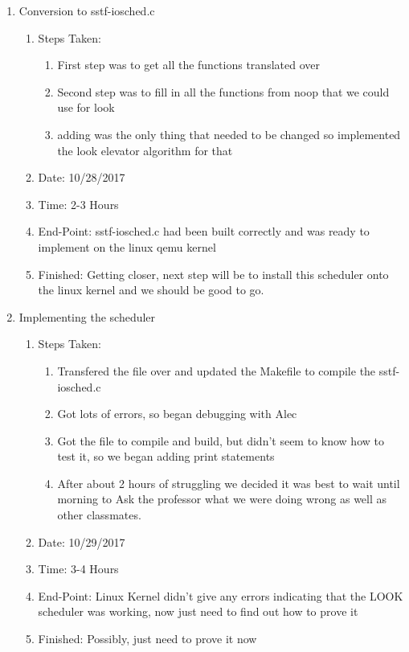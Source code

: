 \documentclass[journal,10pt,onecolumn,compsoc]{IEEEtran} \usepackage[margin=1.0in]{geometry} \usepackage{pdfpages}
\begin{document}
\begin {enumerate}
   
    \item Conversion to sstf-iosched.c
        	\begin {enumerate}
            	\item Steps Taken: 
                	\begin{enumerate}
                    	\item First step was to get all the functions translated over
                        \item Second step was to fill in all the functions from noop that we could use for look
                        \item adding was the only thing that needed to be changed so implemented the look elevator algorithm for that
                    \end{enumerate}
                \item Date: 10/28/2017
                \item Time: 2-3 Hours
                \item End-Point: sstf-iosched.c had been built correctly and was ready to implement on the linux qemu kernel
                \item Finished: Getting closer, next step will be to install this scheduler onto the linux kernel and we should be good to go.
        	\end {enumerate}
    
   
    \item Implementing the scheduler
        	\begin {enumerate}
            	\item Steps Taken: 
                	\begin{enumerate}
                    	\item Transfered the file over and updated the Makefile to compile the sstf-iosched.c
                        \item Got lots of errors, so began debugging with Alec
                        \item Got the file to compile and build, but didn't seem to know how to test it, so we began adding print statements
                        \item After about 2 hours of struggling we decided it was best to wait until morning to Ask the professor what we were doing wrong as well as other classmates.
                    \end{enumerate}
                \item Date: 10/29/2017
                \item Time: 3-4 Hours
                \item End-Point: Linux Kernel didn't give any errors indicating that the LOOK scheduler was working, now just need to find out how to prove it
                \item Finished: Possibly, just need to prove it now \\
        	\end {enumerate}
    

\end{enumerate}
\end{document}
